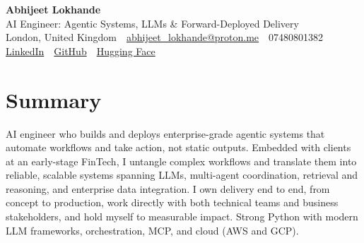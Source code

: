 \documentclass[10pt,a4paper]{article}
\newcommand{\sep}{\,\textcolor{accent!60}{\textbar}\,}
\begin{document}
\begin{center}
  {\fontsize{24}{26}\selectfont\bfseries Abhijeet Lokhande}\\[3pt]
  {\color{accent}\large AI Engineer: Agentic Systems, LLMs \& Forward-Deployed Delivery}\\[5pt]
  {\small
    London, United Kingdom \sep
    \href{mailto:abhijeet_lokhande@proton.me}{abhijeet\_lokhande@proton.me} \sep
    07480801382 \\[2pt]
    \href{https://www.linkedin.com/in/ablds/}{LinkedIn} \sep
    \href{https://github.com/abhijeetscode}{GitHub} \sep
    \href{https://huggingface.co/ab-ai}{Hugging Face}
  }
\end{center}
\vspace{2pt}

\section{Summary}
AI engineer who builds and deploys enterprise-grade agentic systems that automate workflows and take action, not static outputs. Embedded with clients at an early-stage FinTech, I untangle complex workflows and translate them into reliable, scalable systems spanning LLMs, multi-agent coordination, retrieval and reasoning, and enterprise data integration. I own delivery end to end, from concept to production, work directly with both technical teams and business stakeholders, and hold myself to measurable impact. Strong Python with modern LLM frameworks, orchestration, MCP, and cloud (AWS and GCP).

\end{document}
